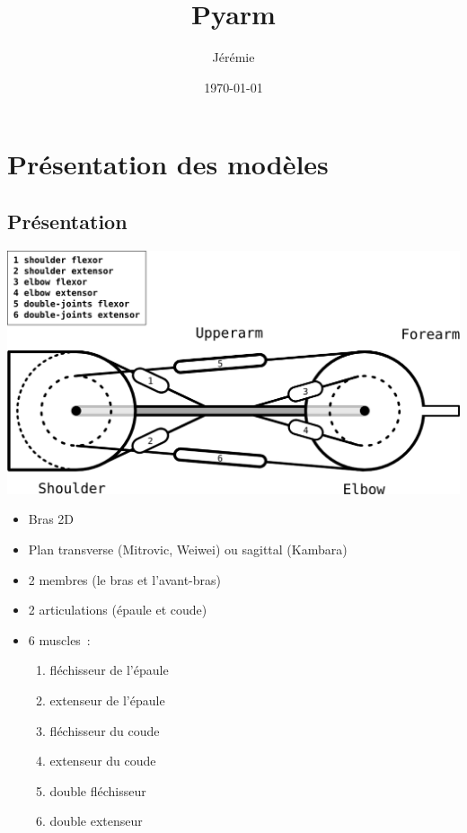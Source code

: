 \documentclass[pdftex,a4paper,11pt]{article}
\numberwithin{equation}{subsection}
\begin{document}
\title{Pyarm}
\author{
	Jérémie 
}
\date{\today{}}

\maketitle


\section{Présentation des modèles}

\subsection{Présentation}

\begin{center}
        \includegraphics[width=.90\linewidth]{fig/muscle4c}
\end{center}

\begin{itemize}
    \item Bras 2D
    \item Plan transverse (Mitrovic, Weiwei) ou sagittal (Kambara)
    \item 2 membres (le bras et l'avant-bras) %
    \item 2 articulations (épaule et coude)
    \item 6 muscles~:
    \begin{enumerate}
        \item fléchisseur de l'épaule
        \item extenseur de l'épaule
        \item fléchisseur du coude
        \item extenseur du coude
        \item double fléchisseur
        \item double extenseur
    \end{enumerate}
\end{itemize}
\end{document}
